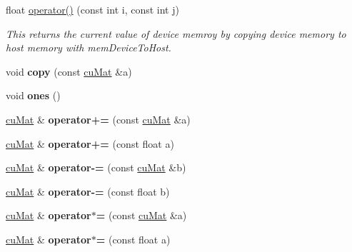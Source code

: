 \begin{DoxyCompactItemize}
float \mbox{\hyperlink{classcuMat_a52ee337354d10e2991f214aff8977824}{operator()}} (const int i, const int j)
\begin{DoxyCompactList}\small\item\em This returns the current value of device memroy by copying device memory to host memory with mem\+Device\+To\+Host. \end{DoxyCompactList}\item 
\mbox{\label{classcuMat_a5f3ed1974e037253edf41119b72965a5}} 
void {\bfseries copy} (const \mbox{\hyperlink{classcuMat}{cu\+Mat}} \&a)
\item 
\mbox{\label{classcuMat_a68d74135c0482c5c3bd9ef0f936e34c9}} 
void {\bfseries ones} ()
\item 
\mbox{\label{classcuMat_a667b0eded8ba2738b8cd788a8df4140a}} 
\mbox{\hyperlink{classcuMat}{cu\+Mat}} \& {\bfseries operator+=} (const \mbox{\hyperlink{classcuMat}{cu\+Mat}} \&a)
\item 
\mbox{\label{classcuMat_ae27474a7b96846439f494d696773e15c}} 
\mbox{\hyperlink{classcuMat}{cu\+Mat}} \& {\bfseries operator+=} (const float a)
\item 
\mbox{\label{classcuMat_a6e9e9499edde4954e2f9e26dc9389ccc}} 
\mbox{\hyperlink{classcuMat}{cu\+Mat}} \& {\bfseries operator-\/=} (const \mbox{\hyperlink{classcuMat}{cu\+Mat}} \&b)
\item 
\mbox{\label{classcuMat_abbd47d837cb067bced0ef042f23f50d5}} 
\mbox{\hyperlink{classcuMat}{cu\+Mat}} \& {\bfseries operator-\/=} (const float b)
\item 
\mbox{\label{classcuMat_ad1f1146ebc4d065e12e8cbe1aabdbe07}} 
\mbox{\hyperlink{classcuMat}{cu\+Mat}} \& {\bfseries operator$\ast$=} (const \mbox{\hyperlink{classcuMat}{cu\+Mat}} \&a)
\item 
\mbox{\label{classcuMat_a84801424e221687c12e674a7810eddae}} 
\mbox{\hyperlink{classcuMat}{cu\+Mat}} \& {\bfseries operator$\ast$=} (const float a)
\item 
\mbox{\label{classcuMat_ae8cb5fe7a8ced5d291286d96afa69352}} 

\end{DoxyCompactItemize}
